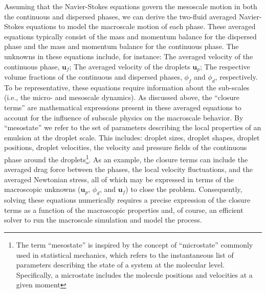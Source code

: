 Assuming that the Navier-Stokes equations govern the mesoscale motion in both the continuous and dispersed phases, we can derive the two-fluid averaged Navier-Stokes equations to model the macroscale motion of each phase. 
These averaged equations typically consist of the mass and momentum balance for the dispersed phase and the mass and momentum balance for the continuous phase. 
The unknowns in these equations include, for instance: The averaged velocity of the continuous phase, $\textbf{u}_f$; The averaged velocity of the droplets $\textbf{u}_p$; The respective volume fractions of the continuous and dispersed phases, $\phi_f$ and $\phi_d$, respectively. 
To be representative, these equations require information about the sub-scales (i.e., the micro- and mesoscale dynamics).
As discussed above, the ``closure terms'' are mathematical expressions present in these averaged equations to account for the influence of subscale physics on the macroscale behavior. 
By ``mesostate'' we refer to the set of parameters describing the local properties of an emulsion at the droplet scale.
This includes:  droplet sizes, droplet shapes, droplet positions, droplet velocities, the velocity and pressure fields of the continuous phase around the droplets\footnote{
    The term ``mesostate'' is inspired by the concept of ``microstate'' commonly used in statistical mechanics, which refers to the instantaneous list of parameters describing the state of a system at the molecular level. Specifically, a microstate includes the molecule positions and velocities at a given moment
    }. 
As an example, the closure terms can include the averaged drag force between the phases, the local velocity fluctuations, and the averaged Newtonian stress, all of which may be expressed in terms of the macroscopic unknowns ($\textbf{u}_p$, $\phi_d$, and $\textbf{u}_f$) to close the problem.
Consequently, solving these equations numerically requires a precise expression of the closure terms as a function of the macroscopic properties and, of course, an efficient solver to run the macroscale simulation and model the process.

